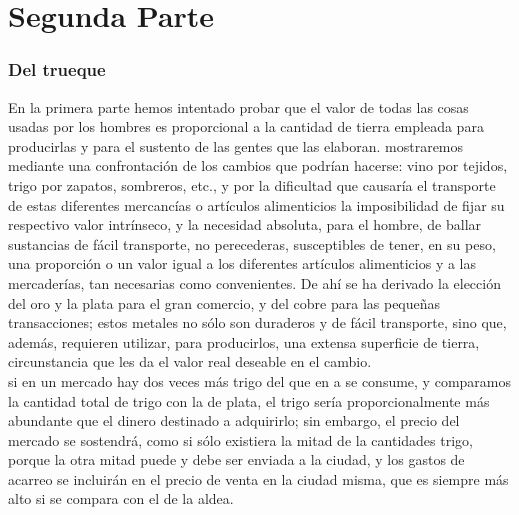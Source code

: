 \documentclass[10pt]{article}
\begin{document}
\part*{\center Segunda Parte}
\begin{multicols}{1}
\section*{Del trueque}
En la primera parte hemos intentado probar que el valor de todas las cosas usadas por los hombres es proporcional a la cantidad de tierra empleada para producirlas y para el sustento de las gentes que las elaboran. mostraremos mediante una confrontación de los cambios que podrían hacerse: vino por tejidos, trigo por zapatos, sombreros, etc., y por la dificultad que causaría el transporte de estas diferentes mercancías o artículos alimenticios la imposibilidad de fijar su respectivo valor intrínseco, y la necesidad absoluta, para el hombre, de ballar sustancias de fácil transporte, no perecederas, susceptibles de tener, en su peso, una proporción o un valor igual a los diferentes artículos alimenticios y a las mercaderías, tan necesarias como convenientes. De ahí se ha derivado la elección del oro y la plata para el gran comercio, y del cobre para las pequeñas transacciones; estos metales no sólo son duraderos y de fácil transporte, sino que, además, requieren utilizar, para producirlos, una extensa superficie de tierra, circunstancia que les da el valor real deseable en el cambio.\\
si en un mercado hay dos veces más trigo del que en a se consume, y comparamos la cantidad total de trigo con la de plata, el trigo sería proporcionalmente más abundante que el dinero destinado a adquirirlo; sin embargo, el precio del mercado se sostendrá, como si sólo existiera la mitad de la cantidades trigo, porque la otra mitad puede y debe ser enviada a la ciudad, y los gastos de acarreo se incluirán en el precio de venta en la ciudad misma, que es siempre más alto si se compara con el de la aldea.

\end{multicols}
\end{document}
